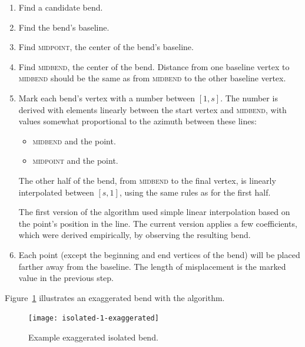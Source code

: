 \documentclass[a4paper]{article}
\begin{document}
\begin{enumerate}
    \item Find a candidate bend.
    \item Find the bend's baseline.
    \item Find \textsc{midpoint}, the center of the bend's baseline.

    \item Find \textsc{midbend}, the center of the bend. Distance from one
        baseline vertex to \textsc{midbend} should be the same as from
        \textsc{midbend} to the other baseline vertex.

    \item Mark each bend's vertex with a number between $[1,s]$. The number is
        derived with elements linearly between the start vertex and
        \textsc{midbend}, with values somewhat proportional to the azimuth
        between these lines:

        \begin{itemize}
            \item \textsc{midbend} and the point.
            \item \textsc{midpoint} and the point.
        \end{itemize}

        The other half of the bend, from \textsc{midbend} to the final vertex,
        is linearly interpolated between $[s,1]$, using the same rules as for
        the first half.

        The first version of the algorithm used simple linear interpolation based
        on the point's position in the line. The current version applies a few
        coefficients, which were derived empirically, by observing the
        resulting bend.

    \item Each point (except the beginning and end vertices of the bend) will
        be placed farther away from the baseline. The length of misplacement is
        the marked value in the previous step.

\end{enumerate}

Figure~\ref{fig:isolated-1-exaggerated} illustrates an exaggerated bend with
the algorithm.

\begin{figure}[ht]
    \centering
    \texttt{[image: isolated-1-exaggerated]}
    \caption{Example exaggerated isolated bend.}
    \label{fig:isolated-1-exaggerated}
\end{figure}
\end{document}
